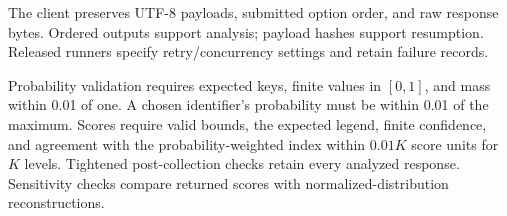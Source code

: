 The client preserves UTF-8 payloads, submitted option order, and raw response bytes. Ordered outputs support analysis; payload hashes support resumption. Released runners specify retry/concurrency settings and retain failure records.

Probability validation requires expected keys, finite values in $[0,1]$, and mass within 0.01 of one. A chosen identifier's probability must be within 0.01 of the maximum. Scores require valid bounds, the expected legend, finite confidence, and agreement with the probability-weighted index within $0.01K$ score units for $K$ levels. Tightened post-collection checks retain every analyzed response. Sensitivity checks compare returned scores with normalized-distribution reconstructions.

